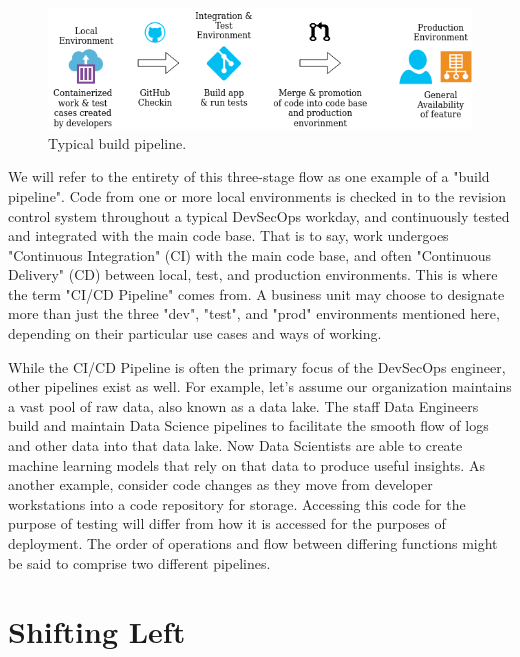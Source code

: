 \begin{figure}[!htb]
	\centering
	\includegraphics[scale=0.63]{../images/flow.png}
	\caption{Typical build pipeline.}
	\label{fig:pipeline}
\end{figure}

\justify
We will refer to the entirety of this three-stage flow as one example of
a "build pipeline". Code from one or more local
environments is checked in to the revision control system throughout a
typical DevSecOps workday, and continuously tested and integrated with
the main code base. That is to say, work undergoes "Continuous Integration"
(CI) with the main code base, 
and often "Continuous Delivery" (CD)
between local, test, and production environments. This is where the term
"CI/CD Pipeline" comes from. A business unit may choose to designate more
than just the three "dev", "test", and "prod" environments mentioned here,
depending on their particular use cases and ways of working. 

\justify
While the CI/CD Pipeline is often the primary focus of the DevSecOps
engineer, other pipelines exist as well. For example, let's assume our
organization maintains a vast pool of raw data, also known as a data
lake. The staff Data Engineers build and maintain 
Data Science pipelines to facilitate the smooth flow
of logs and other data into that data lake. Now Data Scientists are able
to create machine learning models that rely on that data to produce useful
insights. As another example, consider code changes as they move from
developer workstations into a code repository for storage. Accessing
this code for the purpose of testing will differ from how it is accessed
for the purposes of deployment. The order of operations and flow
between differing functions might be said to comprise two different pipelines.

\section{Shifting Left}

